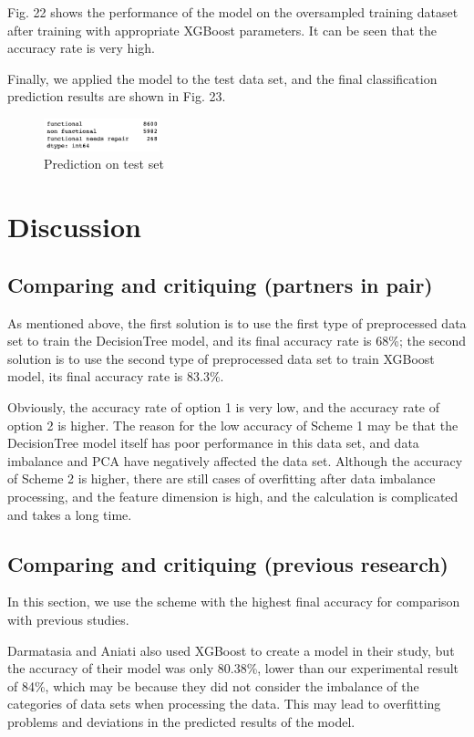 \documentclass[conference]{IEEEtran}
\begin{document}
Fig. 22 shows the performance of the model on the oversampled training dataset after training with appropriate XGBoost parameters. It can be seen that the accuracy rate is very high.

Finally, we applied the model to the test data set, and the final classification prediction results are shown in Fig. 23.

\begin{figure}[H]
\centerline{\includegraphics[width=0.3\textwidth]{22.pic.jpg}}
\caption{Prediction on test set}
\end{figure}

\section{Discussion}
\subsection{Comparing and critiquing (partners in pair)}

As mentioned above, the first solution is to use the first type of preprocessed data set to train the DecisionTree model, and its final accuracy rate is 68\%; the second solution is to use the second type of preprocessed data set to train XGBoost model, its final accuracy rate is 83.3\%.

Obviously, the accuracy rate of option 1 is very low, and the accuracy rate of option 2 is higher. The reason for the low accuracy of Scheme 1 may be that the DecisionTree model itself has poor performance in this data set, and data imbalance and PCA have negatively affected the data set. Although the accuracy of Scheme 2 is higher, there are still cases of overfitting after data imbalance processing, and the feature dimension is high, and the calculation is complicated and takes a long time.

\subsection{Comparing and critiquing (previous research)}

In this section, we use the scheme with the highest final accuracy for comparison with previous studies.

Darmatasia and Aniati also used XGBoost to create a model in their study, but the accuracy of their model was only 80.38\%, lower than our experimental result of 84\%, which may be because they did not consider the imbalance of the categories of data sets when processing the data. This may lead to overfitting problems and deviations in the predicted results of the model\cite{b1}.
\end{document}
